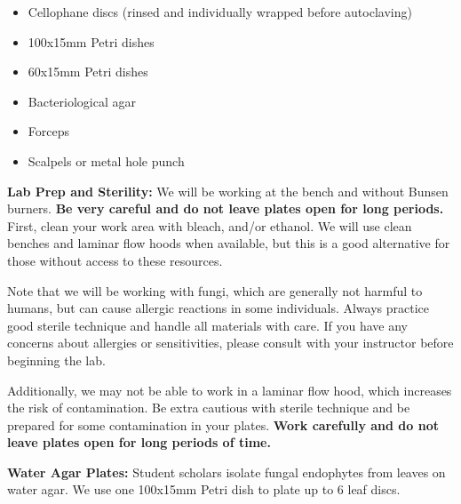 \documentclass[
  letterpaper,
  DIV=11,
  numbers=noendperiod]{scrreprt}
\providecommand{\tightlist}{%
  \setlength{\itemsep}{0pt}\setlength{\parskip}{0pt}}
\begin{document}
\begin{itemize}
\tightlist
\item[$\square$]
  Cellophane discs (rinsed and individually wrapped before autoclaving)
\item[$\square$]
  100x15mm Petri dishes
\item[$\square$]
  60x15mm Petri dishes
\item[$\square$]
  Bacteriological agar
\item[$\square$]
  Forceps
\item[$\square$]
  Scalpels or metal hole punch
\end{itemize}

\textbf{Lab Prep and Sterility:} We will be working at the bench and
without Bunsen burners. \textbf{Be very careful and do not leave plates
open for long periods.} First, clean your work area with bleach, and/or
ethanol. We will use clean benches and laminar flow hoods when
available, but this is a good alternative for those without access to
these resources.

\begin{tcolorbox}[enhanced jigsaw, arc=.35mm, bottomrule=.15mm, bottomtitle=1mm, breakable, colback=white, colbacktitle=quarto-callout-warning-color!10!white, colframe=quarto-callout-warning-color-frame, coltitle=black, left=2mm, leftrule=.75mm, opacityback=0, opacitybacktitle=0.6, rightrule=.15mm, title=\textcolor{quarto-callout-warning-color}{\faExclamationTriangle}\hspace{0.5em}{Warning}, titlerule=0mm, toprule=.15mm, toptitle=1mm]

Note that we will be working with fungi, which are generally not harmful
to humans, but can cause allergic reactions in some individuals. Always
practice good sterile technique and handle all materials with care. If
you have any concerns about allergies or sensitivities, please consult
with your instructor before beginning the lab.

Additionally, we may not be able to work in a laminar flow hood, which
increases the risk of contamination. Be extra cautious with sterile
technique and be prepared for some contamination in your plates.
\textbf{Work carefully and do not leave plates open for long periods of
time.}

\end{tcolorbox}

\textbf{Water Agar Plates:} Student scholars isolate fungal endophytes
from leaves on water agar. We use one 100x15mm Petri dish to plate up to
6 leaf discs.
\end{document}

